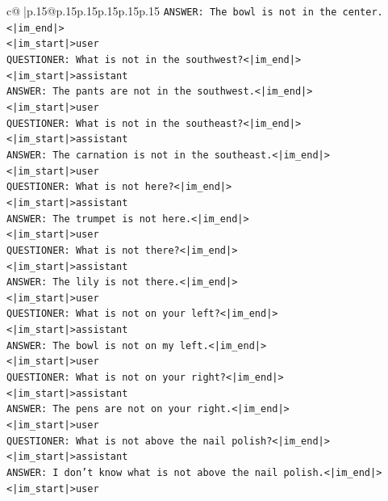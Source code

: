 \documentclass{article}
\begin{document}
{\begin{supertabular}{c@{$\;$}|p{.15\linewidth}@{}p{.15\linewidth}p{.15\linewidth}p{.15\linewidth}p{.15\linewidth}p{.15\linewidth}}
{{{\texttt{ANSWER: The bowl is not in the center.<|im\_end|>} \\
\texttt{<|im\_start|>user} \\
\texttt{QUESTIONER: What is not in the southwest?<|im\_end|>} \\
\texttt{<|im\_start|>assistant} \\
\texttt{ANSWER: The pants are not in the southwest.<|im\_end|>} \\
\texttt{<|im\_start|>user} \\
\texttt{QUESTIONER: What is not in the southeast?<|im\_end|>} \\
\texttt{<|im\_start|>assistant} \\
\texttt{ANSWER: The carnation is not in the southeast.<|im\_end|>} \\
\texttt{<|im\_start|>user} \\
\texttt{QUESTIONER: What is not here?<|im\_end|>} \\
\texttt{<|im\_start|>assistant} \\
\texttt{ANSWER: The trumpet is not here.<|im\_end|>} \\
\texttt{<|im\_start|>user} \\
\texttt{QUESTIONER: What is not there?<|im\_end|>} \\
\texttt{<|im\_start|>assistant} \\
\texttt{ANSWER: The lily is not there.<|im\_end|>} \\
\texttt{<|im\_start|>user} \\
\texttt{QUESTIONER: What is not on your left?<|im\_end|>} \\
\texttt{<|im\_start|>assistant} \\
\texttt{ANSWER: The bowl is not on my left.<|im\_end|>} \\
\texttt{<|im\_start|>user} \\
\texttt{QUESTIONER: What is not on your right?<|im\_end|>} \\
\texttt{<|im\_start|>assistant} \\
\texttt{ANSWER: The pens are not on your right.<|im\_end|>} \\
\texttt{<|im\_start|>user} \\
\texttt{QUESTIONER: What is not above the nail polish?<|im\_end|>} \\
\texttt{<|im\_start|>assistant} \\
\texttt{ANSWER: I don't know what is not above the nail polish.<|im\_end|>} \\
\texttt{<|im\_start|>user} \\
}}}
\end{supertabular}}
\end{document}
